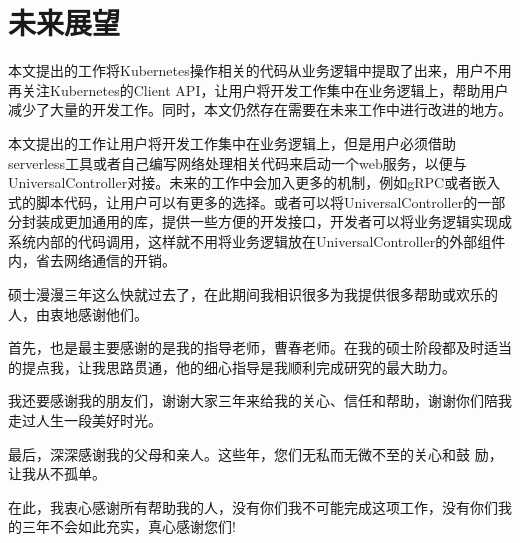 \documentclass[macfonts,master]{njuthesis}
\begin{document}
\section{未来展望}
本文提出的工作将Kubernetes操作相关的代码从业务逻辑中提取了出来，用户不用再关注Kubernetes的Client API，让用户将开发工作集中在业务逻辑上，帮助用户减少了大量的开发工作。同时，本文仍然存在需要在未来工作中进行改进的地方。

本文提出的工作让用户将开发工作集中在业务逻辑上，但是用户必须借助serverless工具或者自己编写网络处理相关代码来启动一个web服务，以便与UniversalController对接。未来的工作中会加入更多的机制，例如gRPC或者嵌入式的脚本代码，让用户可以有更多的选择。或者可以将UniversalController的一部分封装成更加通用的库，提供一些方便的开发接口，开发者可以将业务逻辑实现成系统内部的代码调用，这样就不用将业务逻辑放在UniversalController的外部组件内，省去网络通信的开销。
\begin{acknowledgement}
  硕士漫漫三年这么快就过去了，在此期间我相识很多为我提供很多帮助或欢乐的人，由衷地感谢他们。
  
首先，也是最主要感谢的是我的指导老师，曹春老师。在我的硕士阶段都及时适当的提点我，让我思路贯通，他的细心指导是我顺利完成研究的最大助力。

我还要感谢我的朋友们，谢谢大家三年来给我的关心、信任和帮助，谢谢你们陪我走过人生一段美好时光。

最后，深深感谢我的父母和亲人。这些年，您们无私而无微不至的关心和鼓 励，让我从不孤单。

在此，我衷心感谢所有帮助我的人，没有你们我不可能完成这项工作，没有你们我的三年不会如此充实，真心感谢您们!
\end{acknowledgement}

\nocite{*}

\end{document}
